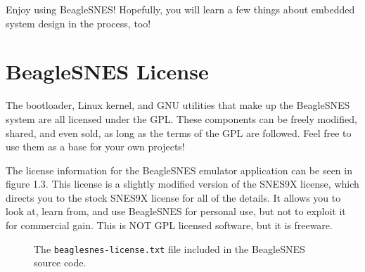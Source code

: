 Enjoy using BeagleSNES!  Hopefully, you will learn a few things about embedded system design in the process, too!

\section{BeagleSNES License}

The bootloader, Linux kernel, and GNU utilities that make up the BeagleSNES system are all licensed under the GPL.  These components can be freely modified, shared, and even sold, as long as the terms of the GPL are followed.  Feel free to use them as a base for your own projects!

The license information for the BeagleSNES emulator application can be seen in figure 1.3.  This license is a slightly modified version of the SNES9X license, which directs you to the stock SNES9X license for all of the details.  It allows you to look at, learn from, and use BeagleSNES for personal use, but not to exploit it for commercial gain.  This is NOT GPL licensed software, but it is freeware.

\begin{figure}[h]

\caption{The \texttt{beaglesnes-license.txt} file included in the BeagleSNES source code.}
\end{figure}